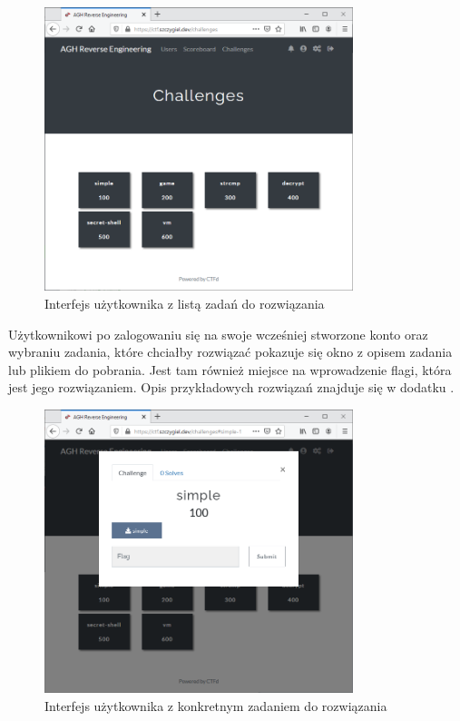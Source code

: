 \documentclass[language=polish,type=eng]{aghmodern}
\begin{document}
\begin{figure}[H]
\centering
\includegraphics[width=9cm]{ui_challenges}
\caption{Interfejs użytkownika z listą zadań do rozwiązania}
\end{figure}

Użytkownikowi po zalogowaniu się na swoje wcześniej stworzone konto oraz
wybraniu zadania, które chciałby rozwiązać pokazuje się okno
z opisem zadania lub plikiem do pobrania. Jest tam również miejsce
na wprowadzenie flagi, która jest jego rozwiązaniem.
Opis przykładowych rozwiązań znajduje się w dodatku .

\begin{figure}[H]
\centering
\includegraphics[width=9cm]{ui_download}
\caption{Interfejs użytkownika z konkretnym zadaniem do rozwiązania}
\end{figure}
\end{document}
